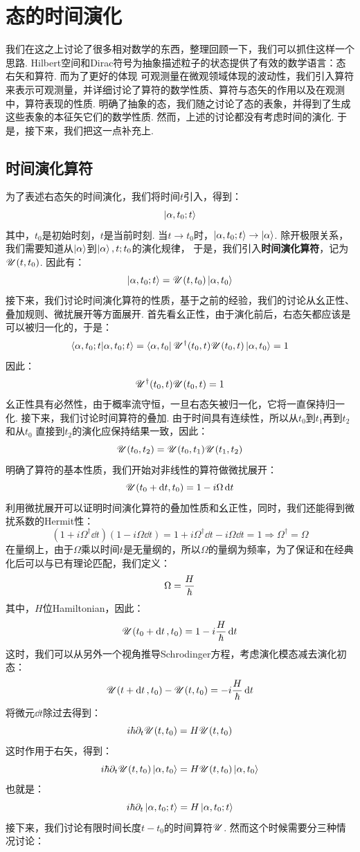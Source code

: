 \section{态的时间演化}
我们在这之上讨论了很多相对数学的东西，整理回顾一下，我们可以抓住这样一个思路. Hilbert空间和Dirac符号为抽象描述粒子的状态提供了有效的数学语言：态右矢和算符. 而为了更好的体现
可观测量在微观领域体现的波动性，我们引入算符来表示可观测量，并详细讨论了算符的数学性质、算符与态矢的作用以及在观测中，算符表现的性质. 明确了抽象的态，我们随之讨论了态的表象，并得到了生成
这些表象的本征矢它们的数学性质. 然而，上述的讨论都没有考虑时间的演化. 于是，接下来，我们把这一点补充上. 
\subsection{时间演化算符}
为了表述右态矢的时间演化，我们将时间\(t\)引入，得到：
\[
\ket{\alpha,t_{0};t}
\]
其中，\(t_{0}\)是初始时刻，\(t\)是当前时刻. 当\(t\to t_{0}\)时，\(\ket{\alpha,t_{0};t}\to\ket{\alpha}\). 除开极限关系，我们需要知道从\(\ket{\alpha}\)到\(\ket{\alpha},t;t_{0}\)的演化规律，
于是，我们引入\textbf{时间演化算符}，记为\(\mathscr{U}(t,t_{0})\). 因此有：
\[
\ket{\alpha,t_{0};t} = \mathscr{U}(t,t_{0})\ket{\alpha,t_{0}}
\]
接下来，我们讨论时间演化算符的性质，基于之前的经验，我们的讨论从幺正性、叠加规则、微扰展开等方面展开. 首先看幺正性，由于演化前后，右态矢都应该是可以被归一化的，于是：
\[
\bra{\alpha,t_{0};t}\ket{\alpha,t_{0};t} = \bra{\alpha,t_{0}}\mathscr{U}^{\dagger}(t_{0},t)\mathscr{U}(t_{0},t)\ket{\alpha,t_{0}} = 1
\]
因此：
\[
\mathscr{U}^{\dagger}(t_{0},t)\mathscr{U}(t_{0},t) = 1
\]
幺正性具有必然性，由于概率流守恒，一旦右态矢被归一化，它将一直保持归一化. 接下来，我们讨论时间算符的叠加. 由于时间具有连续性，所以从\(t_{0}\)到\(t_{1}\)再到\(t_{2}\)和从\(t_{0}\)
直接到\(t_{2}\)的演化应保持结果一致，因此：
\[
\mathscr{U}(t_{0},t_{2}) = \mathscr{U}(t_{0},t_{1})\mathscr{U}(t_{1},t_{2})
\]
明确了算符的基本性质，我们开始对非线性的算符做微扰展开：
\[
\mathscr{U}(t_{0}+\dd t,t_{0}) = 1 - i\Omega\dd{t}
\]
利用微扰展开可以证明时间演化算符的叠加性质和幺正性，同时，我们还能得到微扰系数的Hermit性：
\[
(1+i\Omega^{\dagger}\dd{t})(1- i\Omega\dd{t}) = 1 + i\Omega^{\dagger}\dd{t} - i\Omega\dd{t} = 1 \Longrightarrow \Omega^{\dagger} = \Omega
\]
在量纲上，由于\(\Omega\)乘以时间\(t\)是无量纲的，所以\(\Omega\)的量纲为频率，为了保证和在经典化后可以与已有理论匹配，我们定义：
\[
\Omega = \frac{H}{\hbar}
\]
其中，\(H\)位Hamiltonian，因此：
\[
\mathscr{U}(t_{0}+\dd{t},t_{0}) = 1 - i\frac{H}{\hbar}\dd{t}
\]
这时，我们可以从另外一个视角推导Schrodinger方程，考虑演化模态减去演化初态：
\[
\mathscr{U}(t+\dd{t},t_{0}) - \mathscr{U}(t,t_{0}) = -i\frac{H}{\hbar}\dd{t}
\]
将微元\(\dd{t}\)除过去得到：
\[
i\hbar\partial_{t}\mathscr{U}(t,t_{0}) = H\mathscr{U}(t,t_{0})
\]
这时作用于右矢，得到：
\[
i\hbar\partial_{t}\mathscr{U}(t,t_{0})\ket{\alpha,t_{0}} = H\mathscr{U}(t,t_{0})\ket{\alpha,t_{0}} 
\]
也就是：
\[
i\hbar\partial_{t}\ket{\alpha,t_{0};t} = H\ket{\alpha,t_{0};t}
\]
接下来，我们讨论有限时间长度\(t-t_{0}\)的时间算符\(\mathscr{U}\). 然而这个时候需要分三种情况讨论：
